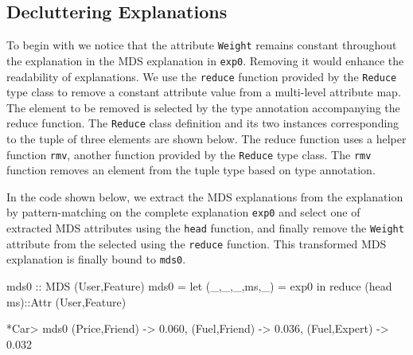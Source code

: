\documentclass{jfp}
\newcommand{\prog}[1]{\texttt{#1}}
\begin{document}
\subsection{Decluttering Explanations}\label{ReduceExpl}
To begin with we notice that the attribute \prog{Weight} remains constant throughout the explanation in the MDS explanation in \prog{exp0}. Removing it would enhance the readability of explanations. We use the \prog{reduce} function provided by the \prog{Reduce} type class to remove a constant attribute value from a multi-level attribute map. The element to be removed is selected by the type annotation accompanying the reduce function. The \prog{Reduce} class definition and its two instances corresponding to the tuple of three elements are shown below. The reduce function uses a helper function \prog{rmv}, another function provided by the \prog{Reduce} type class. The \prog{rmv} function removes an element from the tuple type based on type annotation. 
In the code shown below, we extract the MDS explanations from the explanation by pattern-matching on the complete explanation \prog{exp0} and select one of extracted MDS attributes using the \prog{head} function, and finally remove the \prog{Weight} attribute from the selected using the \prog{reduce} function. This transformed MDS explanation is finally bound to \prog{mds0}.
\begin{haskellcode}
mds0 :: MDS (User,Feature)
mds0 = let (_,_,_,ms,_) = exp0
       in  reduce (head ms)::Attr (User,Feature)
       
*Car> mds0
{(Price,Friend) -> 0.060,
 (Fuel,Friend) -> 0.036,
 (Fuel,Expert) -> 0.032}
\end{haskellcode}
\end{document}
